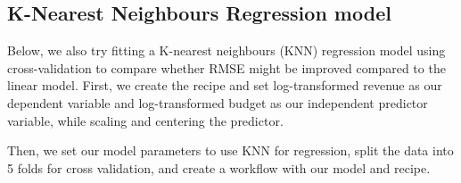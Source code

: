 \documentclass[
  letterpaper,
  DIV=11,
  numbers=noendperiod]{scrartcl}
\begin{document}
\subsection{K-Nearest Neighbours Regression
model}\label{k-nearest-neighbours-regression-model}

Below, we also try fitting a K-nearest neighbours (KNN) regression model
using cross-validation to compare whether RMSE might be improved
compared to the linear model. First, we create the recipe and set
log-transformed revenue as our dependent variable and log-transformed
budget as our independent predictor variable, while scaling and
centering the predictor.

Then, we set our model parameters to use KNN for regression, split the
data into 5 folds for cross validation, and create a workflow with our
model and recipe.
\end{document}
